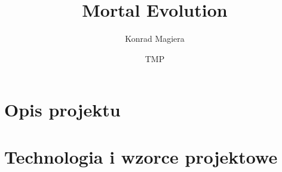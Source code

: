 \documentclass[a4paper,12pt, twoside]{article}
\title{\textbf{Mortal Evolution}}
\author{Konrad Magiera}
\date{TMP}
\begin{document}
\maketitle
\tableofcontents
\newpage
{}

\section{Opis projektu}


\newpage
\section{Technologia i wzorce projektowe}

 
\end{document}
